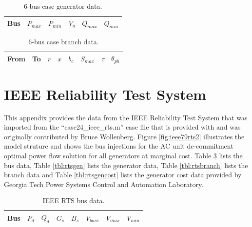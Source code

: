\begin{table}[h]
\begin{center}
\begin{tabular}{c|c|c|c|c|c}
\hline
Bus &$P_{max}$ &$P_{min}$ &$V_g$ &$Q_{max}$ &$Q_{min}$\\
\hline\hline

\hline
\end{tabular}
\caption{6-bus case generator data.}
\label{tbl:case6ww_gen}
\end{center}
\end{table}

\begin{table}[h]
\begin{center}
\begin{tabular}{c|c|c|c|c|c|c|c}
\hline
From &To &$r$ &$x$ &$b_c$ &$S_{max}$ &$\tau$ &$\theta_{ph}$\\
\hline\hline

\hline
\end{tabular}
\caption{6-bus case branch data.}
\label{tbl:case6ww_branch}
\end{center}
\end{table}

\section{IEEE Reliability Test System}
\label{adx:ieee_rts}
This appendix provides the data from the IEEE Reliability Test System
\cite{ieee79rts} that was imported from the ``case24\_ieee\_rts.m'' case file
that is provided with \matpower and was originally contributed by Bruce
Wollenberg.  Figure \ref{fig:ieee79rts2} illustrates the model struture and
shows the bus injections for the AC unit de-commitment optimal power flow
solution for all generators at marginal cost.  Table \ref{tbl:rtsbus} lists the
bus data, Table \ref{tbl:rtsgen} lists the generator data, Table
\ref{tbl:rtsbranch} lists the branch data and Table \ref{tbl:rtsgencost} lists
the generator cost data provided by Georgia Tech Power Systems Control and
Automation Laboratory.


\begin{table}[h]
\begin{center}
\begin{tabular}{c|c|c|c|c|c|c|c}
\hline
Bus &$P_d$ &$Q_d$ &$G_s$ &$B_s$ &$V_{base}$ &$V_{max}$ &$V_{min}$\\
\hline\hline

\hline
\end{tabular}
\caption{IEEE RTS bus data.}
\label{tbl:rtsbus}
\end{center}
\end{table}

